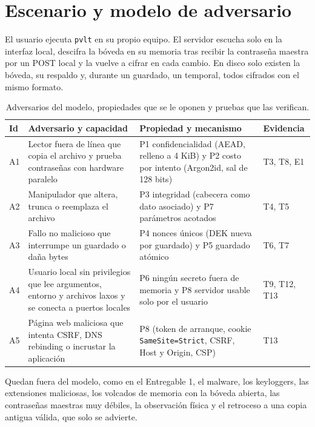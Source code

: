 \documentclass[11pt,letterpaper]{article}
\newcommand{\code}[1]{\texttt{#1}}
\newcommand{\pvlt}{\code{pvlt}}
\begin{document}
\section{Escenario y modelo de adversario}\label{sec:modelo}

El usuario ejecuta \pvlt{} en su propio equipo. El servidor escucha solo en la interfaz local, descifra la bóveda en su memoria tras recibir la contraseña maestra por un POST local y la vuelve a cifrar en cada cambio. En disco solo existen la bóveda, su respaldo y, durante un guardado, un temporal, todos cifrados con el mismo formato.

\begin{table}[h]
\centering\small
\caption{Adversarios del modelo, propiedades que se le oponen y pruebas que las verifican.}
\label{tab:adversarios}
\begin{tabularx}{\linewidth}{@{}l>{\raggedright\arraybackslash}X>{\raggedright\arraybackslash}Xl@{}}
\toprule
Id & Adversario y capacidad & Propiedad y mecanismo & Evidencia \\
\midrule
A1 & Lector fuera de línea que copia el archivo y prueba contraseñas con hardware paralelo & P1 confidencialidad (AEAD, relleno a 4 KiB) y P2 costo por intento (Argon2id, sal de 128 bits) & T3, T8, E1 \\
A2 & Manipulador que altera, trunca o reemplaza el archivo & P3 integridad (cabecera como dato asociado) y P7 parámetros acotados & T4, T5 \\
A3 & Fallo no malicioso que interrumpe un guardado o daña bytes & P4 nonces únicos (DEK nueva por guardado) y P5 guardado atómico & T6, T7 \\
A4 & Usuario local sin privilegios que lee argumentos, entorno y archivos laxos y se conecta a puertos locales & P6 ningún secreto fuera de memoria y P8 servidor usable solo por el usuario & T9, T12, T13 \\
A5 & Página web maliciosa que intenta CSRF, DNS rebinding o incrustar la aplicación & P8 (token de arranque, cookie \code{SameSite=Strict}, CSRF, Host y Origin, CSP) & T13 \\
\bottomrule
\end{tabularx}
\end{table}

Quedan fuera del modelo, como en el Entregable 1, el malware, los keyloggers, las extensiones maliciosas, los volcados de memoria con la bóveda abierta, las contraseñas maestras muy débiles, la observación física y el retroceso a una copia antigua válida, que solo se advierte.
\end{document}
